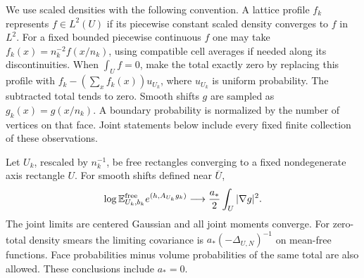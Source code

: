 We use scaled densities with the following convention. A lattice
profile $f_k$ represents $f\in L^2(U)$ if its piecewise constant
scaled density converges to $f$ in $L^2$. For a fixed bounded piecewise
continuous $f$ one may take $f_k(x)=n_k^{-2}f(x/n_k)$, using compatible
cell averages if needed along its discontinuities. When $\int_Uf=0$,
make the total exactly zero by replacing this profile with
$f_k-(\sum_xf_k(x))u_{U_k}$, where $u_{U_k}$ is uniform probability.
The subtracted total tends to zero. Smooth shifts $g$ are sampled as
$g_k(x)=g(x/n_k)$. A boundary probability is normalized by the number
of vertices on that face. Joint statements below include every fixed
finite collection of these observations.

\begin{lemma}\label{lem:profile-free}
Let $U_k$, rescaled by $n_k^{-1}$, be free rectangles converging to a
fixed nondegenerate axis rectangle $U$. For smooth shifts defined near
$\overline U$,
\begin{equation}\label{eq:profile-free-gradient}
 \log\mathbb E_{U_k,b_k}^{\mathrm{free}}e^{(h,A_{U_k}g_k)}
       \longrightarrow \frac{a_*}{2}\int_U|\nabla g|^2.
\end{equation}
The joint limits are centered Gaussian and all joint moments converge.
For zero-total density smears the limiting covariance is
$a_*(-\Delta_{U,N})^{-1}$ on mean-free functions. Face probabilities
minus volume probabilities of the same total are also allowed.
These conclusions include $a_*=0$.
\end{lemma}


